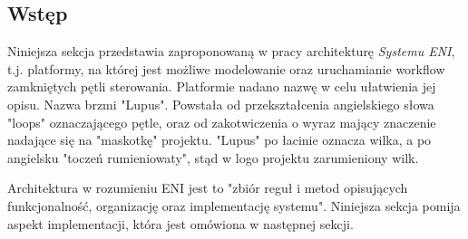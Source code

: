\subsection{Wstęp}

Niniejsza sekcja przedstawia zaproponowaną w pracy architekturę \textit{Systemu ENI}, t.j. platformy, na której jest możliwe modelowanie oraz uruchamianie workflow zamkniętych pętli sterowania. Platformie nadano nazwę w celu ułatwienia jej opisu. Nazwa brzmi "Lupus". Powstała od przekształcenia angielskiego słowa "loops" oznaczającego pętle, oraz od zakotwiczenia o wyraz mający znaczenie nadające się na "maskotkę" projektu. "Lupus" po łacinie oznacza wilka, a po angielsku "toczeń rumieniowaty", stąd w logo projektu zarumieniony wilk. 

Architektura w rozumieniu ENI jest to "zbiór reguł i metod opisujących funkcjonalność, organizację oraz implementację systemu". Niniejsza sekcja pomija aspekt implementacji, która jest omówiona w następnej sekcji. 

